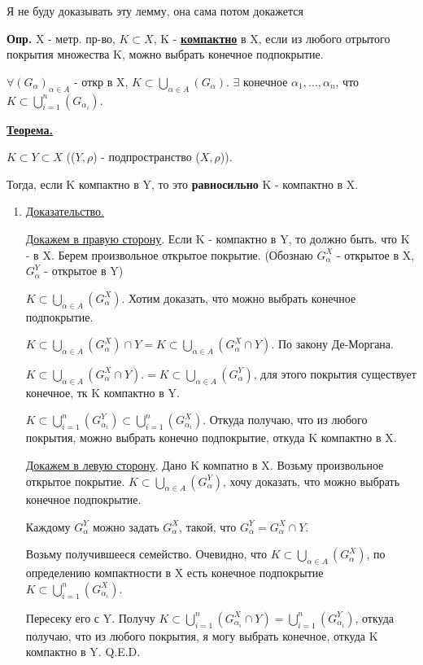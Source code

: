 \documentclass{article}
\newcommand{\deff}[1]{\underline{\textbf{#1}}}
\newcommand{\thmm}[1]{\underline{\textbf{#1}}}
\begin{document}
Я не буду доказывать эту лемму, она сама потом докажется

\textbf{Опр.} X - метр. пр-во, $K \subset X$, K - \deff{компактно} в X, если из любого отрытого покрытия множества K, можно выбрать конечное подпокрытие.

$\forall (G_{\alpha})_{\alpha \in A}$ - откр в X, $K \subset \bigcup\limits_{\alpha \in A} (G_\alpha)$. $\exists$ конечное $\alpha_1,\ldots,\alpha_n$, что $K \subset \bigcup\limits_{i=1}^n (G_{\alpha_i})$.

\thmm{Теорема.}

$K \subset Y \subset X$ (($Y,\rho$) - подпространство ($X,\rho$)).

Тогда, если K компактно в Y, то это \textbf{равносильно} K - компактно в X.

\begin{enumerate}
        \item[] \uline{Доказательство.}

        \uline{Докажем в правую сторону}. Если K - компактно в Y, то должно быть. что K - в X.  Берем произвольное открытое покрытие. (Обознаю $G_\alpha^X$ - открытое в X,  $G_\alpha^Y$ - открытое в Y)
        
        $K \subset \bigcup\limits_{\alpha \in A} (G_\alpha^X)$. Хотим доказать, что можно выбрать конечное подпокрытие.

         $K \subset \bigcup\limits_{\alpha \in A} (G_\alpha^X) \cap Y =  K \subset \bigcup\limits_{\alpha \in A} (G_\alpha^X \cap Y).$ По закону Де-Моргана.

        $K \subset \bigcup\limits_{\alpha \in A} (G_\alpha^X \cap Y). = K \subset \bigcup\limits_{\alpha \in A} (G_\alpha^Y)$, для этого покрытия существует конечное, тк K компактно в Y. 

         $K \subset \bigcup\limits_{i=1}^n (G_{\alpha_i}^Y)\subset \bigcup\limits_{i=1}^n (G_{\alpha_i}^X)$. Откуда получаю, что из любого покрытия, можно выбрать конечно подпокрытие, откуда K компактно в X. 

         \uline{Докажем в левую сторону}. Дано K компатно в X. Возьму произвольное открытое  покрытие. $K \subset \bigcup\limits_{\alpha \in A} (G_\alpha^Y)$, хочу доказать, что можно выбрать конечное подпокрытие.

         Каждому $G_\alpha^Y$   можно задать $G_\alpha^X$, такой, что $G_\alpha^Y = G_\alpha^X \cap Y$.

         Возьму получившееся семейство. Очевидно, что $ K \subset \bigcup\limits_{\alpha \in A} (G_\alpha^X)$, по определению компактности в X есть конечное подпокрытие $K \subset\bigcup\limits_{i=1}^n (G_{\alpha_i}^X)$.

         Пересеку его с Y. Получу $K \subset \bigcup\limits_{i=1}^n (G_{\alpha_i}^X \cap Y )= \bigcup\limits_{i=1}^n (G_{\alpha_i}^Y)$, откуда получаю, что из любого покрытия, я могу выбрать конечное, откуда K компактно в Y. Q.E.D. 
\end{enumerate}
\end{document}
